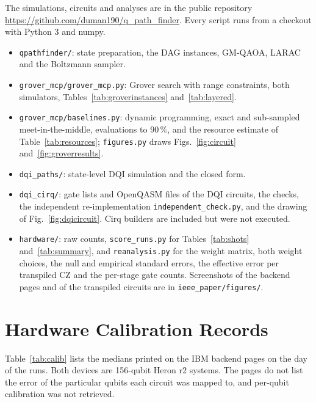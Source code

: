\documentclass[journal]{IEEEtran}
\begin{document}
The simulations, circuits and analyses are in the public repository \url{https://github.com/duman190/q_path_finder}. Every script runs from a checkout with Python 3 and numpy.
\begin{itemize}
  \item \texttt{qpathfinder/}: state preparation, the DAG instances, GM-QAOA, LARAC and the Boltzmann sampler.
  \item \texttt{grover\_mcp/grover\_mcp.py}: Grover search with range constraints, both simulators, Tables~\ref{tab:groverinstances} and~\ref{tab:layered}.
  \item \texttt{grover\_mcp/baselines.py}: dynamic programming, exact and sub-sampled meet-in-the-middle, evaluations to 90\,\%, and the resource estimate of Table~\ref{tab:resources}; \texttt{figures.py} draws Figs.~\ref{fig:circuit} and~\ref{fig:groverresults}.
  \item \texttt{dqi\_paths/}: state-level DQI simulation and the closed form.
  \item \texttt{dqi\_cirq/}: gate lists and OpenQASM files of the DQI circuits, the checks, the independent re-implementation \texttt{independent\_check.py}, and the drawing of Fig.~\ref{fig:dqicircuit}. Cirq builders are included but were not executed.
  \item \texttt{hardware/}: raw counts, \texttt{score\_runs.py} for Tables~\ref{tab:shots} and~\ref{tab:summary}, and \texttt{reanalysis.py} for the weight matrix, both weight choices, the null and empirical standard errors, the effective error per transpiled CZ and the per-stage gate counts. Screenshots of the backend pages and of the transpiled circuits are in \texttt{ieee\_paper/figures/}.
\end{itemize}

\section{Hardware Calibration Records}
\label{app:calibration}

Table~\ref{tab:calib} lists the medians printed on the IBM backend pages on the day of the runs. Both devices are 156-qubit Heron r2 systems. The pages do not list the error of the particular qubits each circuit was mapped to, and per-qubit calibration was not retrieved.
\end{document}
